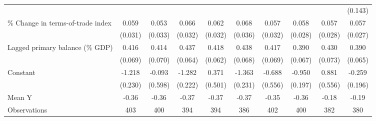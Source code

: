 {\begin{tabular}{l*{9}{c}}
                    &                     &                     &                     &                     &                     &                     &                     &                     &     (0.143)         \\
\addlinespace
\% Change in terms-of-trade index&       0.059\sym{*}  &       0.053         &       0.066\sym{**} &       0.062\sym{*}  &       0.068\sym{*}  &       0.057\sym{*}  &       0.058\sym{**} &       0.057\sym{*}  &       0.057\sym{**} \\
                    &     (0.031)         &     (0.033)         &     (0.032)         &     (0.032)         &     (0.036)         &     (0.032)         &     (0.028)         &     (0.028)         &     (0.027)         \\
\addlinespace
Lagged primary balance (\% GDP)&       0.416\sym{***}&       0.414\sym{***}&       0.437\sym{***}&       0.418\sym{***}&       0.438\sym{***}&       0.417\sym{***}&       0.390\sym{***}&       0.430\sym{***}&       0.390\sym{***}\\
                    &     (0.069)         &     (0.070)         &     (0.064)         &     (0.062)         &     (0.068)         &     (0.069)         &     (0.067)         &     (0.073)         &     (0.065)         \\
\addlinespace
Constant            &      -1.218\sym{***}&      -0.093         &      -1.282\sym{***}&       0.371         &      -1.363\sym{***}&      -0.688         &      -0.950\sym{***}&       0.881         &      -0.259         \\
                    &     (0.230)         &     (0.598)         &     (0.222)         &     (0.501)         &     (0.231)         &     (0.556)         &     (0.197)         &     (0.556)         &     (0.196)         \\
\midrule
Mean Y              &       -0.36         &       -0.36         &       -0.37         &       -0.37         &       -0.37         &       -0.35         &       -0.36         &       -0.18         &       -0.19         \\
Observations        &         403         &         400         &         394         &         394         &         386         &         402         &         400         &         382         &         380         \\
\bottomrule
\end{tabular}
}
